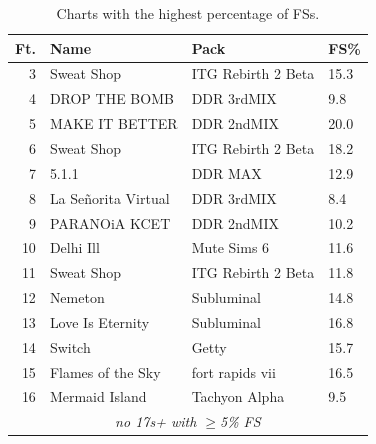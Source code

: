 \documentclass[10pt]{sigplanconf}
\begin{document}
\begin{table}[t]
	\begin{center}
		\small
	\begin{tabular}{r|l|l|l}
		\bf Ft. & \bf Name & \bf Pack & \bf FS\% \\
		\hline
		 3 & Sweat Shop       & ITG Rebirth 2 Beta    & 15.3 \\
		 4 & DROP THE BOMB    & DDR 3rdMIX            &  9.8 \\
		 5 & MAKE IT BETTER   & DDR 2ndMIX            & 20.0 \\
		 6 & Sweat Shop       & ITG Rebirth 2 Beta    & 18.2 \\
		 7 & 5.1.1            & DDR MAX               & 12.9 \\
		 8 & La Se\~{n}orita Virtual & DDR 3rdMIX     &  8.4 \\
		 9 & PARANOiA KCET    & DDR 2ndMIX            & 10.2 \\
		10 & Delhi Ill        & Mute Sims 6           & 11.6 \\
		11 & Sweat Shop       & ITG Rebirth 2 Beta    & 11.8 \\
		12 & Nemeton          & Subluminal            & 14.8 \\
		13 & Love Is Eternity & Subluminal            & 16.8 \\
		14 & Switch           & Getty                 & 15.7 \\
		15 & Flames of the Sky & fort rapids vii      & 16.5 \\
		16 & Mermaid Island   & Tachyon Alpha         &  9.5 \\
		\multicolumn{4}{c}{\em no 17s+ with $\ge$5\% FS} \\
	\end{tabular}
	\end{center}
	\caption{Charts with the highest percentage of FSs.} %
	\label{tab:chart-fsp}
\end{table}
\end{document}
